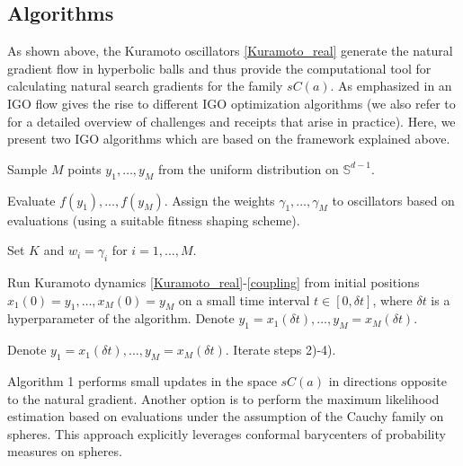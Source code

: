 \documentclass{article}
\theoremstyle{plain}%
\theoremstyle{definition}
\theoremstyle{remark}
\theoremstyle{prop}
\begin{document}
\subsection{Algorithms}

As shown above, the Kuramoto oscillators \eqref{Kuramoto_real} generate the natural gradient flow in hyperbolic balls and thus provide the computational tool for calculating natural search gradients for the family $sC(a)$. As emphasized in \cite{OAAH} an IGO flow gives the rise to different IGO optimization algorithms (we also refer to \cite{HA} for a detailed overview of challenges and receipts that arise in practice). Here, we present two IGO algorithms which are based on the framework explained above.    

\begin{algorithm}[H]
\caption{Small updates along the natural gradient}
\begin{algorithmic}[1]

\State Sample $M$ points $y_1,\dots,y_M$ from the uniform distribution on ${\mathbb S}^{d-1}$.

\State Evaluate $f(y_1),\dots,f(y_M)$. Assign the weights $\gamma_1,\dots,\gamma_M$ to oscillators based on evaluations (using a suitable fitness shaping scheme). 

\State Set $K$ and $w_i = \gamma_i$ for $i=1,\dots,M$.

\State Run Kuramoto dynamics \eqref{Kuramoto_real}-\eqref{coupling} from initial positions $x_1(0) = y_1,\dots,x_M(0)=y_M$ on a small time interval $t \in [0,\delta t]$, where $\delta t$ is a hyperparameter of the algorithm. Denote $y_1=x_1(\delta t),\dots,y_M = x_M(\delta t).$ 

\State Denote $y_1 = x_1(\delta t),\dots,y_M = x_M(\delta t)$. Iterate steps 2)-4).

\end{algorithmic}
\end{algorithm}


Algorithm 1 performs small updates in the space $sC(a)$ in directions opposite to the natural gradient. Another option is to perform the maximum likelihood estimation based on evaluations under the assumption of the Cauchy family on spheres. This approach explicitly leverages conformal barycenters of probability measures on spheres.
\end{document}
